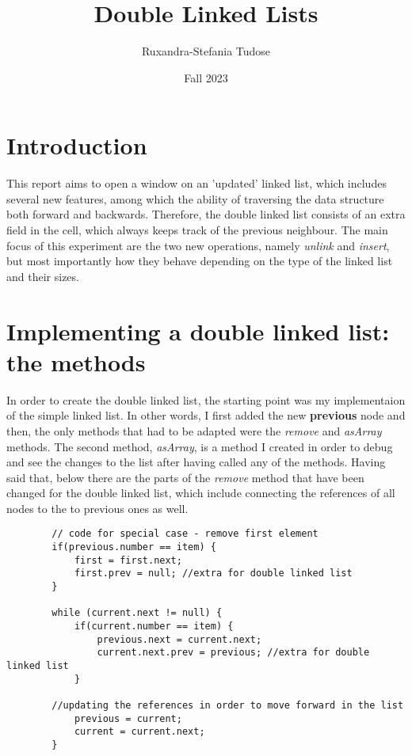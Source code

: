 \documentclass[a4paper,11pt]{article}
\begin{document}
\title{
    \textbf{Double Linked Lists}
}
\author{Ruxandra-Stefania Tudose}
\date{Fall 2023}

\maketitle

\section*{Introduction}

This report aims to open a window on an 'updated' linked list, which includes several new features, among which the ability of
traversing the data structure both forward and backwards. 
Therefore, the double linked list consists of an extra field in the cell, which always keeps track of the previous neighbour. The main focus
of this experiment are the two new operations, namely \textit{unlink} and \textit{insert}, but most importantly how they behave depending on the 
type of the linked list and their sizes.


\section*{Implementing a double linked list: the methods}

In order to create the double linked list, the starting point was my implementaion of the simple linked list.
In other words, I first added the new \textbf{previous} node and then,
the only methods that had to be adapted were the \textit{remove} and \textit{asArray} methods. The second method, \textit{asArray}, is a method I 
created in order to debug and see the changes to the list after having called any of the methods.
Having said that, below there are the parts of the \textit{remove} method that have been changed for the double linked list, which 
include connecting the references of all nodes to the
to previous ones as well.

\begin{verbatim}
        // code for special case - remove first element
        if(previous.number == item) { 
            first = first.next;
            first.prev = null; //extra for double linked list
        }    
   
        while (current.next != null) {
            if(current.number == item) {
                previous.next = current.next;
                current.next.prev = previous; //extra for double linked list
            }

        //updating the references in order to move forward in the list
            previous = current;
            current = current.next;
        }
\end{verbatim}  
\end{document}
